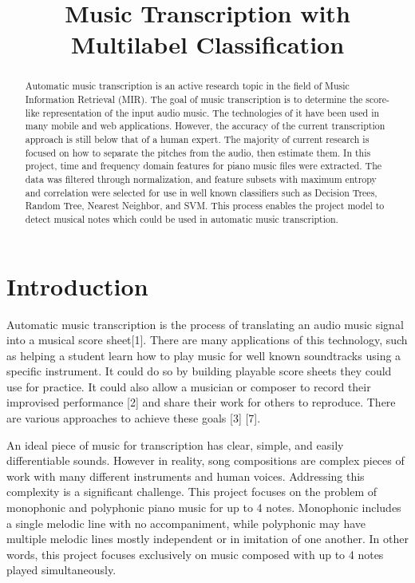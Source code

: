 \documentclass{article}
\title{Music Transcription with Multilabel Classification}
\begin{document}
%
\maketitle
%
\begin{abstract}
Automatic music transcription is an active research topic in the field of Music Information Retrieval (MIR). The goal of music transcription is to determine the score-like representation of the input audio music. The technologies of it have been used in many mobile and web applications. However, the accuracy of the current transcription approach is still below that of a human expert. The majority of current research is focused on how to separate the pitches from the audio, then estimate them. In this project, time and frequency domain features for piano music files were extracted. The data was filtered through normalization, and feature subsets with maximum entropy and correlation were selected for use in well known classifiers such as Decision Trees, Random Tree, Nearest Neighbor, and SVM. This process enables the project model to detect musical notes which could be used in automatic music transcription.
\end{abstract}
%
\section{Introduction}\label{sec:introduction}
Automatic music transcription is the process of translating an audio music signal into a musical score sheet[1]. There are many applications of this technology, such as helping a student learn how to play music for well known soundtracks using a specific instrument. It could do so by building playable score sheets they could use for practice. It could also allow a musician or composer to record their improvised performance [2] and share their work for others to reproduce. There are various approaches to achieve these goals [3] [7]. 

An ideal piece of music for transcription has clear, simple, and easily differentiable sounds. However in reality, song compositions are complex pieces of work with many different instruments and human voices. Addressing this complexity is a significant challenge. This project focuses on the problem of monophonic and polyphonic piano music for up to 4 notes. Monophonic includes a single melodic line with no accompaniment, while polyphonic may have multiple melodic lines mostly independent or in imitation of one another. In other words, this project focuses exclusively on music composed with up to 4 notes played simultaneously.
\end{document}

